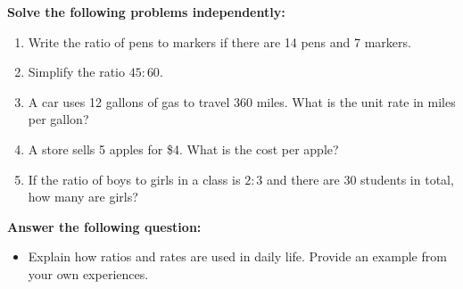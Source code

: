 \documentclass[12pt]{article}
\begin{document}
\begin{tcolorbox}[colframe=black!60, colback=white, 
coltitle=black, colbacktitle=black!15, fonttitle=\bfseries\Large, 
title=Independent Practice, halign title=center, left=10pt, right=10pt, top=10pt, bottom=45pt]
\textbf{Solve the following problems independently:}
\begin{enumerate}[itemsep=3em]
    \item Write the ratio of pens to markers if there are 14 pens and 7 markers.
    \item Simplify the ratio \( 45:60 \).
    \item A car uses 12 gallons of gas to travel 360 miles. What is the unit rate in miles per gallon?
    \item A store sells 5 apples for \$4. What is the cost per apple?
    \item If the ratio of boys to girls in a class is \( 2:3 \) and there are 30 students in total, how many are girls?
\end{enumerate}
\end{tcolorbox}

\begin{tcolorbox}[colframe=black!60, colback=white, 
coltitle=black, colbacktitle=black!15, fonttitle=\bfseries\Large, 
title=Exit Ticket, halign title=center, left=10pt, right=10pt, top=10pt, bottom=110pt]
\textbf{Answer the following question:}
\begin{itemize}
    \item Explain how ratios and rates are used in daily life. Provide an example from your own experiences.
\end{itemize}
\end{tcolorbox}
\end{document}

